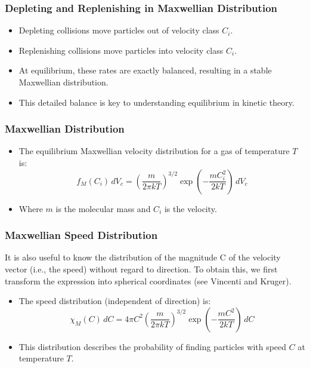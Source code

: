 \documentclass{beamer}
\begin{document}
\begin{frame}
\frametitle{Depleting and Replenishing in Maxwellian Distribution}
\begin{itemize}
    \item Depleting collisions move particles out of velocity class \( C_i \).
    \item Replenishing collisions move particles into velocity class \( C_i \).
    \item At equilibrium, these rates are exactly balanced, resulting in a stable Maxwellian distribution.
    \item This detailed balance is key to understanding equilibrium in kinetic theory.
\end{itemize}
\end{frame}


\begin{frame}
\frametitle{Maxwellian Distribution}
\begin{itemize}
    \item The equilibrium Maxwellian velocity distribution for a gas of temperature \( T \) is:
    \[
    f_M(C_i) \, dV_c = \left( \frac{m}{2\pi k T} \right)^{3/2} \exp \left( - \frac{m C_i^2}{2 k T} \right) \, dV_c
    \]
    \item Where \( m \) is the molecular mass and \( C_i \) is the velocity.
\end{itemize}
\end{frame}

\begin{frame}
\frametitle{Maxwellian Speed Distribution}
It is also useful to know the distribution of the magnitude C of the velocity vector (i.e., the speed) without regard to direction. To obtain this, we first transform the expression into spherical coordinates (see Vincenti and Kruger).
\begin{itemize}
    \item The speed distribution (independent of direction) is:
    \[\boxed{
    \chi_M(C) \, dC = 4\pi C^2 \left( \frac{m}{2\pi k T} \right)^{3/2} \exp \left( - \frac{m C^2}{2 k T} \right) \, dC}
    \]
    \item This distribution describes the probability of finding particles with speed \( C \) at temperature \( T \).
\end{itemize}
\end{frame}
\end{document}
